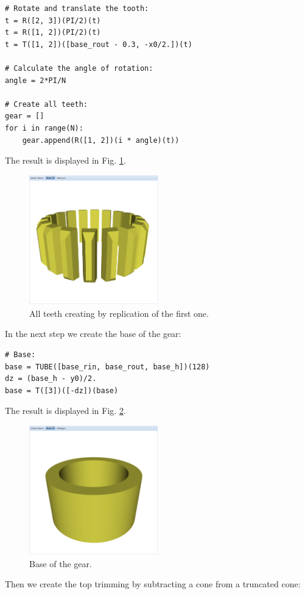 \documentclass{article}
\begin{document}
{\small
\begin{verbatim}
# Rotate and translate the tooth:
t = R([2, 3])(PI/2)(t)
t = R([1, 2])(PI/2)(t)
t = T([1, 2])([base_rout - 0.3, -x0/2.])(t)

# Calculate the angle of rotation:
angle = 2*PI/N

# Create all teeth:
gear = []
for i in range(N):
    gear.append(R([1, 2])(i * angle)(t))
\end{verbatim}
}
\noindent
The result is displayed in Fig. \ref{fig:gear-2}.
\newpage

\begin{figure}[!ht]
\begin{center}
\includegraphics[width=0.5\textwidth]{img/gear-2.png}
\end{center}
\vspace{-2mm}
\caption{All teeth creating by replication of the first one.}
\label{fig:gear-2}
\end{figure}
\noindent
In the next step we create the base of the gear:


{\small
\begin{verbatim}
# Base:
base = TUBE([base_rin, base_rout, base_h])(128)
dz = (base_h - y0)/2.
base = T([3])([-dz])(base)
\end{verbatim}
}
\noindent
The result is displayed in Fig. \ref{fig:gear-3}.
\newpage

\begin{figure}[!ht]
\begin{center}
\includegraphics[width=0.5\textwidth]{img/gear-3.png}
\end{center}
\vspace{-2mm}
\caption{Base of the gear.}
\label{fig:gear-3}
\end{figure}
\noindent
Then we create the top trimming by subtracting a cone from a truncated cone:
\end{document}
